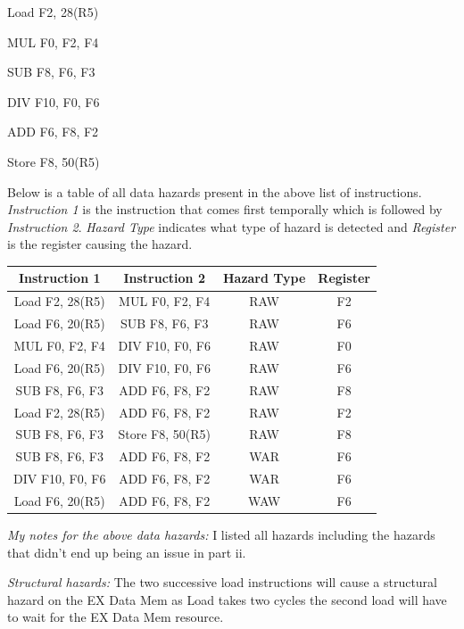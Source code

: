 \documentclass[a4paper, 11pt]{exam}
\begin{document}
\begin{enumerate}
\begin{enumerate}
\begin {center}
Load F2, 28(R5)

MUL F0, F2, F4

SUB F8, F6, F3

DIV F10, F0, F6

ADD F6, F8, F2

Store F8, 50(R5)

\end {center}
 
Below is a table of all data hazards present in the above list of instructions. \textit{Instruction 1} is the instruction that comes first temporally which is followed by \textit{Instruction 2}. \textit{Hazard Type} indicates what type of hazard is detected and \textit{Register} is the register causing the hazard.

\begin{center}
\begin{tabular}{ |c|c|c|c| } 
 \hline
  \textbf{Instruction 1} & \textbf{Instruction 2} & \textbf{Hazard Type} & \textbf{Register} \\ 
  \hline
 Load F2, 28(R5) & MUL F0, F2, F4 & RAW & F2\\ \hline
 Load F6, 20(R5) & SUB F8, F6, F3 & RAW & F6\\ \hline
 MUL F0, F2, F4 & DIV F10, F0, F6 & RAW & F0 \\ \hline
 Load F6, 20(R5) & DIV F10, F0, F6 & RAW & F6 \\ \hline
 SUB F8, F6, F3 & ADD F6, F8, F2 & RAW & F8\\ \hline
 Load F2, 28(R5) & ADD F6, F8, F2 & RAW & F2\\ \hline
 SUB F8, F6, F3 & Store F8, 50(R5) & RAW & F8\\ \hline
 SUB F8, F6, F3 & ADD F6, F8, F2 & WAR & F6\\ \hline
 DIV F10, F0, F6 & ADD F6, F8, F2 & WAR & F6\\ \hline
 Load F6, 20(R5) & ADD F6, F8, F2 & WAW & F6\\ \hline
\end{tabular}
\end{center}

\textit{My notes for the above data hazards:} I listed all hazards including the hazards that didn't end up being an issue in part ii.

\textit{Structural hazards:} The two successive load instructions will cause a structural hazard on the EX Data Mem as Load takes two cycles the second load will have to wait for the EX Data Mem resource.

\hfill


\end{enumerate}
\end{enumerate}
\end{document}
